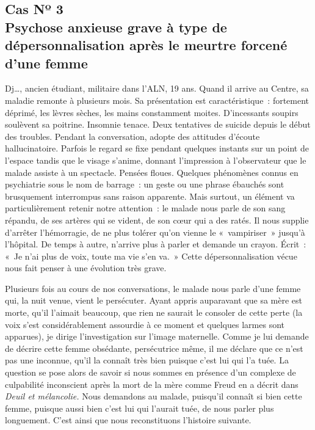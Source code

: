 \documentclass[french,twoside]{book} %
\begin{document}
\subsection[{Cas Nº 3. Psychose anxieuse grave à type de dépersonnalisation après le meurtre forcené d’une femme}]{Cas Nº 3 \\
Psychose anxieuse grave à type de dépersonnalisation après le meurtre forcené d’une femme}
\noindent Dj…, ancien étudiant, militaire dans l’ALN, 19 ans. Quand il arrive au Centre, sa maladie remonte à plusieurs mois. Sa présentation est caractéristique : fortement déprimé, les lèvres   sèches, les mains constamment moites. D’incessants soupirs soulèvent sa poitrine. Insomnie tenace. Deux tentatives de suicide depuis le début des troubles. Pendant la conversation, adopte des attitudes d’écoute hallucinatoire. Parfois le regard se fixe pendant quelques instants sur un point de l’espace tandis que le visage s’anime, donnant l’impression à l’observateur que le malade assiste à un spectacle. Pensées floues. Quelques phénomènes connus en psychiatrie sous le nom de barrage : un geste ou une phrase ébauchés sont brusquement interrompus sans raison apparente. Mais surtout, un élément va particulièrement retenir notre attention : le malade nous parle de son sang répandu, de ses artères qui se vident, de son cœur qui a des ratés. Il nous supplie d’arrêter l’hémorragie, de ne plus tolérer qu’on vienne le « vampiriser » jusqu’à l’hôpital. De temps à autre, n’arrive plus à parler et demande un crayon. Écrit : « Je n’ai plus de voix, toute ma vie s’en va. » Cette dépersonnalisation vécue nous fait penser à une évolution très grave.\par
Plusieurs fois au cours de nos conversations, le malade nous parle d’une femme qui, la nuit venue, vient le persécuter. Ayant appris auparavant que sa mère est morte, qu’il l’aimait beaucoup, que rien ne saurait le consoler de cette perte (la voix s’est considérablement assourdie à ce moment et quelques larmes sont apparues), je dirige l’investigation sur l’image maternelle. Comme je lui demande de décrire cette femme obsédante, persécutrice même, il me déclare que ce n’est pas une inconnue, qu’il la connaît très bien puisque c’est lui qui l’a tuée. La question se pose alors de savoir si nous sommes en présence d’un complexe de culpabilité inconscient après la mort de la mère comme Freud en a décrit dans \emph{Deuil et mélancolie.} Nous demandons au malade, puisqu’il connaît si bien cette femme, puisque aussi bien c’est lui qui l’aurait tuée, de nous parler plus longuement. C’est ainsi que nous reconstituons l’histoire suivante.\par
\end{document}
